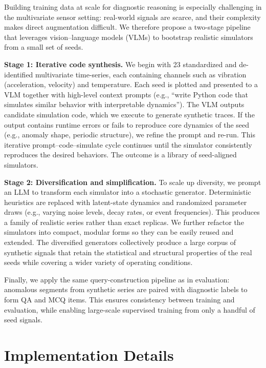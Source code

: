 \documentclass[twoside]{article}
\begin{document}
Building training data at scale for diagnostic reasoning is especially challenging in the multivariate sensor setting: real-world signals are scarce, and their complexity makes direct augmentation difficult. We therefore propose a two-stage pipeline that leverages vision–language models (VLMs) to bootstrap realistic simulators from a small set of seeds.

\textbf{Stage 1: Iterative code synthesis.}  
We begin with 23 standardized and de-identified multivariate time-series, each containing channels such as vibration (acceleration, velocity) and temperature. Each seed is plotted and presented to a VLM together with high-level context prompts (e.g., “write Python code that simulates similar behavior with interpretable dynamics”). The VLM outputs candidate simulation code, which we execute to generate synthetic traces. If the output contains runtime errors or fails to reproduce core dynamics of the seed (e.g., anomaly shape, periodic structure), we refine the prompt and re-run. This iterative prompt–code–simulate cycle continues until the simulator consistently reproduces the desired behaviors. The outcome is a library of seed-aligned simulators.

\textbf{Stage 2: Diversification and simplification.}  
To scale up diversity, we prompt an LLM to transform each simulator into a stochastic generator. Deterministic heuristics are replaced with latent-state dynamics and randomized parameter draws (e.g., varying noise levels, decay rates, or event frequencies). This produces a family of realistic series rather than exact replicas. We further refactor the simulators into compact, modular forms so they can be easily reused and extended. The diversified generators collectively produce a large corpus of synthetic signals that retain the statistical and structural properties of the real seeds while covering a wider variety of operating conditions.

Finally, we apply the same query-construction pipeline as in evaluation: anomalous segments from synthetic series are paired with diagnostic labels to form QA and MCQ items. This ensures consistency between training and evaluation, while enabling large-scale supervised training from only a handful of seed signals.

\section{Implementation Details}
\label{app:implementation}
\end{document}

